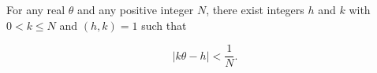 For any real $\theta$ and any positive integer $N$, there exist integers $h$ and $k$ with $0 < k \leq N$ and $(h, k) = 1$ such that

$$|k\theta - h| < \frac{1}{N}.$$
